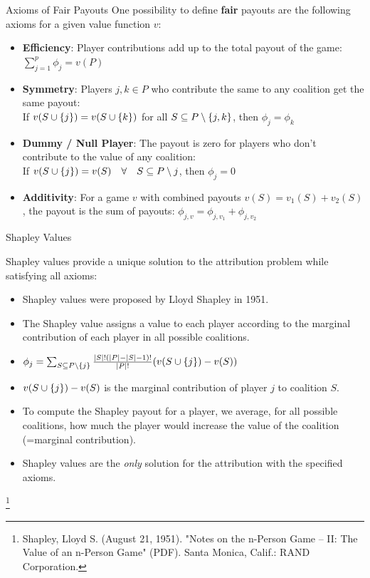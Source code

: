 \documentclass[11pt,compress,t,notes=noshow, aspectratio=169, xcolor=table]{beamer}
\begin{document}
\begin{vbframe}{Axioms of Fair Payouts}
  One possibility to define \textbf{fair} payouts are the following axioms for a given value function $v$:
  \vspace{0.25cm}
  \begin{itemize}
  \itemsep1em
    \item \textbf{Efficiency}: Player contributions add up to the total payout of the game:
      $\sum\nolimits_{j=1}^p\phi_j = v(P)$
    \item \textbf{Symmetry}: Players $j,k \in P$ who contribute the same to any coalition get the same payout: \\
      If $v(\Scupj) = v(\Scupk)$ for all $\SsubP \setminus\{j,k\}$, then $\phi_j=\phi_k$
    \item \textbf{Dummy / Null Player}: The payout is zero for players who don't contribute to the value of any coalition: \\
      If $v(\Scupj)=v(S)\quad  \forall \quad \SsubP \setminus j$, then $\phi_j=0$
    \item \textbf{Additivity}: For a game $v$ with combined payouts $v(S) = v_1(S) + v_2(S)$, the payout is the sum of payouts: $\phi_{j,v} = \phi_{j,v_1} + \phi_{j, v_2}$
  \end{itemize}
  \vspace{0.5cm}
  

\end{vbframe}


\begin{vbframe}{Shapley Values}

  Shapley values provide a unique solution to the attribution problem while satisfying all axioms:
    \vspace{0.25cm}
\begin{itemize}
  \itemsep1em
  \item Shapley values were proposed by Lloyd Shapley in 1951.
  \item The Shapley value assigns a value to each player according to the marginal contribution of each player in all possible coalitions.
  \item $\phi_j = \sum_{\SsubPnoj} \frac{|S|!(|P| - |S| - 1)!}{|P|!}(v(\Scupj) - v(S))$
  \item $v(\Scupj) - v(S)$ is the marginal contribution of player $j$ to coalition $S$.
  \item To compute the Shapley payout for a player, we average, for all possible coalitions, how much the player would increase the value of the coalition (=marginal contribution).
  \item Shapley values are the \textit{only} solution for the attribution with the specified axioms.
\end{itemize}

\footnote{Shapley, Lloyd S. (August 21, 1951). "Notes on the n-Person Game -- II: The Value of an n-Person Game" (PDF). Santa Monica, Calif.: RAND Corporation.}

\end{vbframe}
\end{document}
